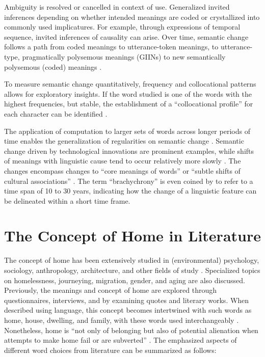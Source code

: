 Ambiguity is resolved or cancelled in context of use. Generalized invited inferences depending on whether intended meanings are coded or crystallized into commonly used implicatures. For example, through expressions of temporal sequence, invited inferences of causality can arise. Over time, semantic change follows a path from coded meanings to utterance-token meanings, to utterance-type, pragmatically polysemous meanings (GIINs) to new semantically
polysemous (coded) meanings \parencite[49]{traugott2001regularity}.

To measure semantic change quantitatively, frequency and collocational patterns allows for exploratory insights. If the word studied is one of the words with the highest frequencies, but stable, the establishment of a ``collocational profile'' for each character can be identified \parencite{firth1957modes}.

The application of computation to larger sets of words across longer periods of time enables the generalization of regularities on semantic change \parencite{hamilton2016law}. Semantic change driven by technological innovations are prominent examples, while shifts of meanings with linguistic cause tend to occur relatively more slowly \parencite{hamilton2016law}. The changes encompass changes to ``core meanings of words'' or ``subtle shifts of cultural associations'' \parencite{hamilton2016cultural}. The term ``brachychrony'' is even coined by \textcite{renouf2002time}\textcite{mair1998corpora} to refer to a time span of 10 to 30 years, indicating how the change of a linguistic feature can be delineated within a short time frame.

\section{The Concept of Home in Literature}
The concept of home has been extensively studied in (environmental) psychology, sociology, anthropology, architecture, and other fields of study \parencite{samanani2019house,mallett2004understanding,moore2000placing,sixsmith1986meaning}. Specialized topics on homelessness, journeying, migration, gender, and aging are also discussed. Previously, the meanings and concept of home are explored through questionnaires, interviews, and by examining quotes and literary works. When described using language, this concept becomes intertwined with such words as home, house, dwelling, and family, with these words used interchangeably \parencite{mallett2004understanding,sixsmith1986meaning}. Nonetheless, home is ``not only of belonging but also of potential alienation when attempts to make home fail or are subverted'' \parencite{samanani2019house}. The emphasized aspects of different word choices from literature can be summarized as follows: 

